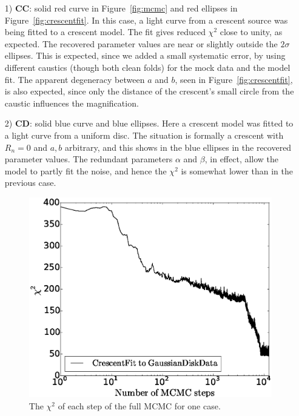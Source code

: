 \documentclass[usenatbib]{mn2e}
\begin{document}
\begin{enumerate}

\item[1) {\bf CC}:] solid red curve in Figure~\ref{fig:mcmc} and red
  ellipses in Figure~\ref{fig:crescentfit}.  In this case, a light
  curve from a crescent source was being fitted to a crescent model.
  The fit gives reduced $\chi^2$ close to unity, as expected.  The
  recovered parameter values are near or slightly outside the
  $2\sigma$ ellipses.  This is expected, since we added a small
  systematic error, by using different caustics (though both clean
  folds) for the mock data and the model fit.  The apparent degeneracy
  between $a$ and $b$, seen in Figure~\ref{fig:crescentfit}, is also
  expected, since only the distance of the crescent's small circle
  from the caustic influences the magnification.


\item[2) {\bf CD}:] solid blue curve and blue ellipses.  Here a
  crescent model was fitted to a light curve from a uniform disc.  The
  situation is formally a crescent with $R_n=0$ and $a,b$ arbitrary,
  and this shows in the blue ellipses in the recovered parameter
  values.  The redundant parameters $\alpha$ and $\beta$, in effect, allow the
  model to partly fit the noise, and hence the $\chi^2$ is somewhat
  lower than in the previous case.

\begin{figure}
\centering
\includegraphics[width=0.9\hsize]{figures/burnin_cg.eps}
\caption{\label{fig:burnin} The $\chi^2$ of each step of the full MCMC
  for one case.}
\end{figure}


\end{enumerate}
\end{document}
